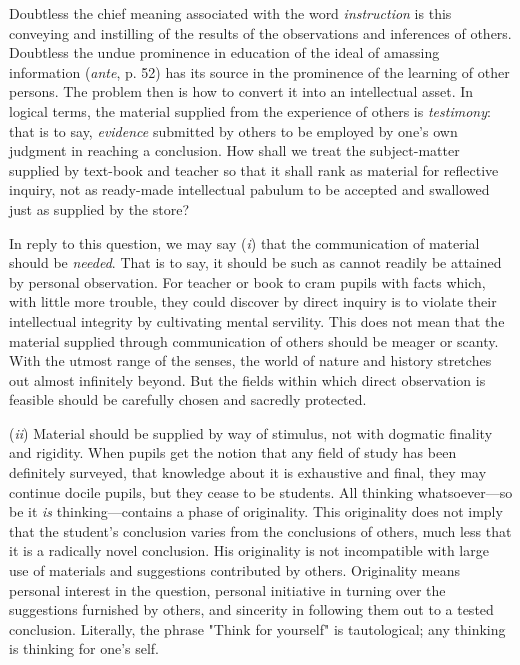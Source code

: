 \documentclass[letterpaper]{book}
\begin{document}

Doubtless the chief meaning associated with the word \emph{instruction}
is this conveying and instilling of the results of the observations and
inferences of others. Doubtless the undue prominence in education of the
ideal of amassing information (\emph{ante}, p. 52) has its source in the
prominence of the learning of other persons. The problem then is how to
convert it into an intellectual asset. In logical terms, the material
supplied from the experience of others is \emph{testimony}: that is to
say, \emph{evidence} submitted by others to be employed by one's own
judgment in reaching a conclusion. How shall we treat the subject-matter
supplied by text-book and teacher so that it shall rank as material for
reflective
inquiry, not as ready-made intellectual pabulum to be accepted and
swallowed just as supplied by the store?


In reply to this question, we may say (\emph{i}) that the communication
of material should be \emph{needed}. That is to say, it should be such
as cannot readily be attained by personal observation. For teacher or
book to cram pupils with facts which, with little more trouble, they
could discover by direct inquiry is to violate their intellectual
integrity by cultivating mental servility. This does not mean that the
material supplied through communication of others should be meager or
scanty. With the utmost range of the senses, the world of nature and
history stretches out almost infinitely beyond. But the fields within
which direct observation is feasible should be carefully chosen and
sacredly protected.


(\emph{ii}) Material should be supplied by way of stimulus, not with
dogmatic finality and rigidity. When pupils get the notion that any
field of study has been definitely surveyed, that knowledge about it is
exhaustive and final, they may continue docile pupils, but they cease to
be students. All thinking whatsoever---so be it \emph{is}
thinking---contains a phase of originality. This originality does not
imply that the student's conclusion varies from the conclusions of
others, much less that it is a radically novel conclusion. His
originality is not incompatible with large use of materials and
suggestions contributed by others. Originality means personal interest
in the question, personal initiative in turning over the suggestions
furnished by others, and sincerity in following them out to a tested
conclusion. Literally, the phrase "Think for yourself" is tautological;
any thinking is thinking for one's
self.
\end{document}
